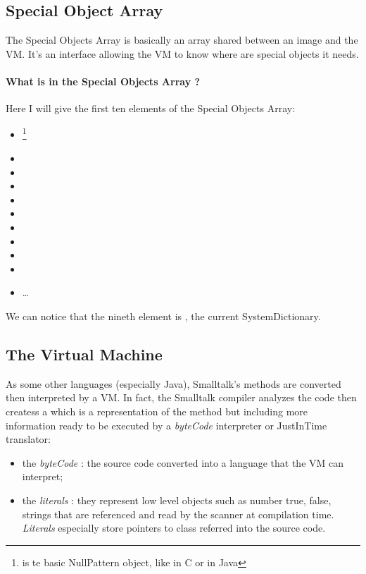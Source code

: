 \subsection{Special Object Array}

The \gls{Special Objects Array} is basically an array shared between an image and the \gls{VM}. It's an interface allowing the \gls{VM} to know where are special objects it needs.

\paragraph{What is in the Special Objects Array ?}
Here I will give the first ten elements of the \gls{Special Objects Array}:
\begin{itemize}
	\item {}\footnote{ is te basic NullPattern object, like  in C or  in Java} 
	\item {}
	\item {}
	\item {}
	\item {}
	\item {}
	\item {}
	\item {}
	\item {}
	\item {}
	\item \dots
\end{itemize}

We can notice that the nineth element is , the current SystemDictionary.

\subsection{The Virtual Machine}

As some other languages (especially Java), Smalltalk's methods are converted then interpreted by a \gls{VM}. In fact, the Smalltalk compiler analyzes the code then createss a  which is a representation of the method but including more information ready to be executed by a \emph{byteCode} interpreter or JustInTime translator:
\begin{itemize}\label{literal}
	\item the \emph{byteCode} : the source code converted into a language that the \gls{VM} can interpret;
	\item the \emph{literals} : they represent low level objects such as number true, false, strings that are referenced and read by the scanner at compilation time. \emph{Literals} especially store pointers to class referred into the source code.
\end{itemize}

